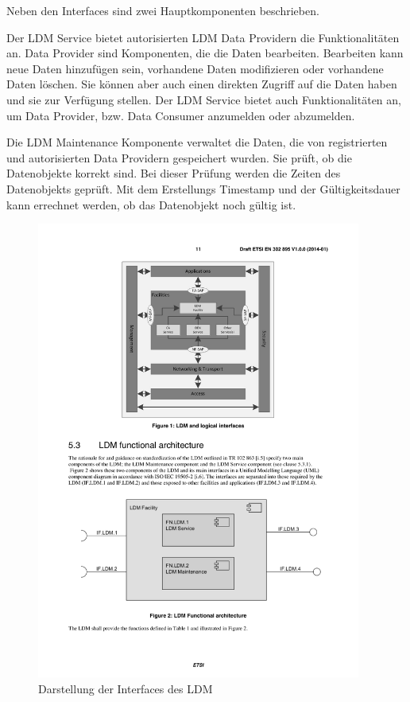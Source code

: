 Neben den Interfaces sind zwei Hauptkomponenten beschrieben. 

Der \ac{LDM} Service bietet  autorisierten \ac{LDM} Data Providern die Funktionalitäten an. Data Provider sind Komponenten, die die Daten bearbeiten. Bearbeiten kann neue Daten hinzufügen sein, vorhandene Daten modifizieren oder vorhandene Daten löschen. Sie können aber auch einen direkten Zugriff auf die Daten haben und sie zur Verfügung stellen. Der \ac{LDM} Service bietet auch Funktionalitäten an, um Data Provider, bzw. Data Consumer anzumelden oder abzumelden. 

Die \ac{LDM} Maintenance Komponente verwaltet die Daten, die von registrierten und autorisierten Data Providern gespeichert wurden. Sie prüft, ob die Datenobjekte korrekt sind. Bei dieser Prüfung werden die Zeiten des Datenobjekts geprüft. Mit dem Erstellungs Timestamp und der Gültigkeitsdauer  kann errechnet werden, ob das Datenobjekt noch gültig ist.

\begin{figure}[htbp]
	\includegraphics[width=0.95\textwidth]{content/images/04_facilitylayer/ldmFunktionelleInterfaces.pdf}
	\caption{Darstellung der Interfaces des LDM \cite{en302895}}
	\label{fig:ldmInterfaces}
\end{figure}



